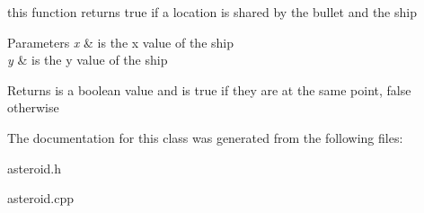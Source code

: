 this function returns true if a location is shared by the bullet and the ship 


\begin{DoxyParams}{Parameters}
{\em x} & is the x value of the ship \\
\hline
{\em y} & is the y value of the ship \\
\hline
\end{DoxyParams}
\begin{DoxyReturn}{Returns}
is a boolean value and is true if they are at the same point, false otherwise 
\end{DoxyReturn}


The documentation for this class was generated from the following files\+:\begin{DoxyCompactItemize}
\item 
asteroid.\+h\item 
asteroid.\+cpp\end{DoxyCompactItemize}
